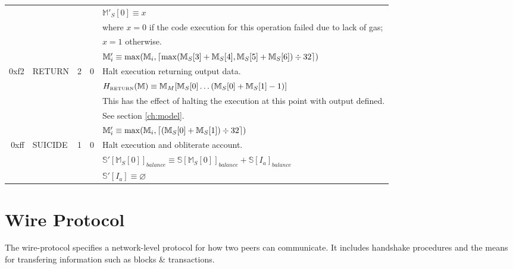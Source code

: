 \documentclass[9pt,oneside]{amsart}
\DeclarePairedDelimiter{\ceil}{\lceil}{\rceil}
\begin{document}
\begin{tabular*}{\columnwidth}[h]{rlrrl}
&&&& $\mathbb{M}'_S[0] \equiv x$ \\
&&&& where $x=0$ if the code execution for this operation failed due to lack of gas;\\
&&&& $x=1$ otherwise. \\
&&&& $\mathbb{M}'_i \equiv \max(\mathbb{M}_i, \ceil{ \max(\mathbb{M}_S[3] + \mathbb{M}_S[4], \mathbb{M}_S[5] + \mathbb{M}_S[6]) \div 32 })$ \\
\midrule
0xf2 & {\small RETURN} & 2 & 0 & Halt execution returning output data. \\
&&&& $H_{\text{\tiny RETURN}}(\mathbb{M}) \equiv \mathbb{M}_M[ \mathbb{M}_S[0] \dots ( \mathbb{M}_S[0] + \mathbb{M}_S[1] - 1 ) ]$ \\
&&&& This has the effect of halting the execution at this point with output defined.\\
&&&& See section \ref{ch:model}. \\
&&&& $\mathbb{M}'_i \equiv \max(\mathbb{M}_i, \ceil{ (\mathbb{M}_S[0] + \mathbb{M}_S[1]) \div 32 })$ \\
\midrule
0xff & {\small SUICIDE} & 1 & 0 & Halt execution and obliterate account. \\
&&&& $\mathbb{S}'[\mathbb{M}_S[0]]_{balance} \equiv \mathbb{S}[\mathbb{M}_S[0]]_{balance} + \mathbb{S}[I_a]_{balance}$ \\
&&&& $\mathbb{S}'[I_a] \equiv \varnothing$ \\
\bottomrule
\end{tabular*}


\section{Wire Protocol}\label{app:wire}
The wire-protocol specifies a network-level protocol for how two peers can communicate. It includes handshake procedures and the means for transfering information such as blocks \& transactions.

\end{document}
